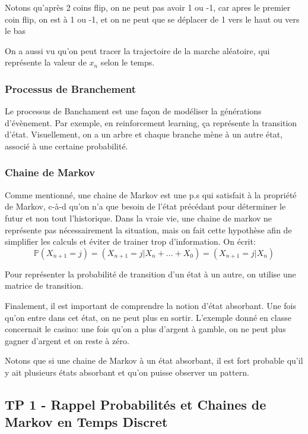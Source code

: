 \documentclass{article}
\begin{document}
Notons qu'après 2 coins flip, on ne peut pas avoir 1 ou -1, car apres le
premier coin flip, on est à 1 ou -1, et on ne peut que se déplacer de 1
vers le haut ou vers le bas

On a aussi vu qu'on peut tracer la trajectoire de la marche aléatoire, qui
représente la valeur de $x_n$ selon le temps.

\subsubsection{Processus de Branchement}%
\label{ssub:processus_de_branchement}

Le processus de Banchament est une façon de modéliser la générations
d'évènement. Par exemple, en reinforcement learning, ça représente la
transition d'état. Visuellement, on a un arbre et chaque branche mène
à un autre état, associé à une certaine probabilité.

\subsubsection{Chaine de Markov}%
\label{ssub:chaine_de_markov}

Comme mentionné, une chaine de Markov est une p.s qui satisfait à la
propriété de Markov, c-à-d qu'on n'a que besoin de l'état précédant pour
déterminer le futur et non tout l'historique. Dans la vraie vie, une
chaine de markov ne représente pas nécessairement la situation, mais
on fait cette hypothèse afin de simplifier les calculs et éviter de
trainer trop d'information. On écrit:
$$ \mathbb{P} (X_{n+1} = j) = (X_{n+1} = j | X_n + ... + X_0) =
(X_{n+1} = j | X_n) $$

Pour représenter la probabilité de transition d'un état à un autre, on
utilise une matrice de transition.

Finalement, il est important de comprendre la notion d'état absorbant.
Une fois qu'on entre dans cet état, on ne peut plus en sortir. L'exemple
donné en classe concernait le casino: une fois qu'on a plus d'argent à
gamble, on ne peut plus gagner d'argent et on reste à zéro.

Notons que si une chaine de Markov à un état absorbant, il est fort
probable qu'il y ait plusieurs états absorbant et qu'on puisse observer
un pattern.

\subsection{TP 1 - Rappel Probabilités et Chaines de Markov en Temps Discret}
\end{document}
